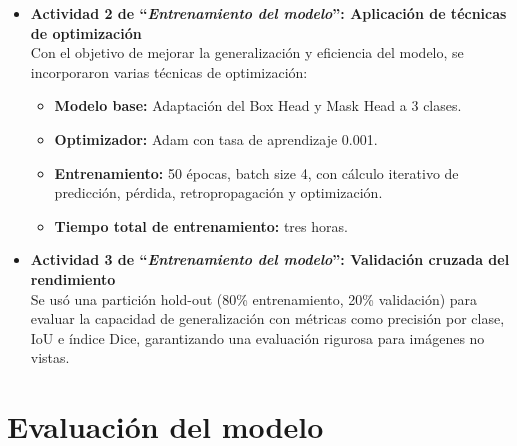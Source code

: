 \begin{enumerate}
\begin{itemize}
  
    \item \textbf{Actividad 2 de “\textit{Entrenamiento del modelo}”: Aplicación de técnicas de optimización}
   \\  
    Con el objetivo de mejorar la generalización y eficiencia del modelo, se incorporaron varias técnicas de optimización:
    
    \begin{itemize}
\item \textbf{Modelo base:} Adaptación del Box Head y Mask Head a 3 clases.

\item \textbf{Optimizador:} Adam con tasa de aprendizaje 0.001.

\item \textbf{Entrenamiento:} 50 épocas, batch size 4, con cálculo iterativo de predicción, pérdida, retropropagación y optimización.

\item \textbf{Tiempo total de entrenamiento:} tres horas.

  \end{itemize}
  
    \item \textbf{Actividad 3 de “\textit{Entrenamiento del modelo}”: Validación cruzada del rendimiento}
   \\ 
    Se usó una partición hold-out (80\% entrenamiento, 20\% validación) para evaluar la capacidad de generalización con métricas como precisión por clase, IoU e índice Dice, garantizando una evaluación rigurosa para imágenes no vistas.

  
  \end{itemize}

\end{enumerate}

\clearpage
\newpage
\section{Evaluación del modelo}

